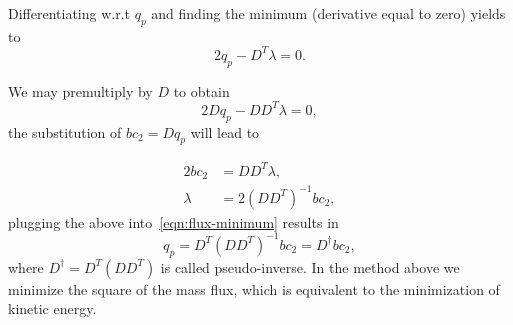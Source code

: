 \documentclass{article}
\begin{document}
Differentiating w.r.t $q_p$ and finding the minimum (derivative equal to zero) yields to
\begin{equation}\label{eqn:flux-minimum}
2 q_p-D^T \lambda=0.
\end{equation}

We may premultiply by $D$ to obtain
\begin{equation*}
2 D q_p-D D^T \lambda=0,
\end{equation*}
the substitution of $bc_2=D q_p$ will lead to

\begin{equation*}
\begin{aligned}
2 bc_2&=D D^T \lambda,\\
\lambda &=2\left(D D^T\right)^{-1} bc_2,
\end{aligned}
\end{equation*}
plugging the above into~\cref{eqn:flux-minimum} results in
\begin{equation*}
q_p=D^T\left(D D^T\right)^{-1} bc_2=D^\dagger bc_2,
\end{equation*}
where $D^\dagger=D^T\left(D D^T\right)$ is called pseudo-inverse. In the method above we minimize the square of the mass flux, which is equivalent to the minimization of kinetic energy. 
 
\end{document}
